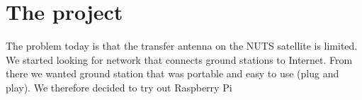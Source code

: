 \chapter{The project}
\label{chap:the_project}




The problem today is that the transfer antenna on the NUTS satellite is limited. We started looking for network that connects ground stations to Internet. From there we wanted ground station that was  portable and easy to use (plug and play). We therefore decided to try out Raspberry Pi 






